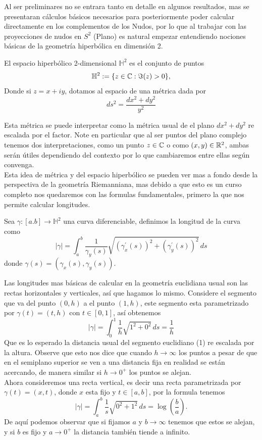 
Al ser preliminares no se entrara tanto en detalle en algunos resultados, mas se presentaran cálculos básicos necesarios para posteriormente poder calcular directamente en los complementos de los Nudos, por lo que al trabajar con las proyecciones de nudos en $S^2$ (Plano) es natural empezar entendiendo nociones básicas de la geometría hiperbólica en dimensión 2.

\begin{definition}
    El espacio hiperbólico 2-dimensional $\mathbb{H}^2$ es el conjunto de puntos
    $$\mathbb{H}^2:=\{z\in\mathbb{C}:\Im(z)>0\},$$
    Donde si $z=x+iy$, dotamos al espacio de una métrica dada por
    $$ds^2=\frac{dx^2+dy^2}{y^2}$$
\end{definition}
Esta métrica se puede interpretar como la métrica usual de el plano $dx^2+dy^2$ re escalada por el factor. Note en particular que al ser puntos del plano complejo tenemos dos interpretaciones, como un punto $z\in\mathbb{C}$ o como $(x,y)\in\mathbb{R}^2$, ambas serán útiles dependiendo del contexto por lo que cambiaremos entre ellas según convenga.\\

Esta idea de métrica y del espacio hiperbólico se pueden ver mas a fondo desde la perspectiva de la geometría Riemanniana, mas debido a que esto es un curso completo nos quedaremos con las formulas fundamentales, primero la que nos permite calcular longitudes.
\begin{definition}
    Sea $\gamma:[a.b]\to \mathbb{H}^2$ una curva diferenciable, definimos la longitud de la curva como 
    $$|\gamma|=\int_a^b\frac{1}{\gamma_y(s)}\sqrt{(\gamma^{\prime}_x(s))^2+(\gamma^{\prime}_y(s))^2}\,ds$$
    donde $\gamma(s)=(\gamma_x(s),\gamma_y(s)).$
\end{definition}


\begin{eg}
    Las longitudes mas básicas de calcular en la geometría euclidiana usual son las rectas horizontales y verticales, así que hagamos lo mismo. Considere el segmento que va del punto $(0,h)$ a el punto $(1,h)$, este segmento esta parametrizado por $\gamma(t)=(t,h)$ con $t\in[0,1]$, así obtenemos
    $$|\gamma|=\int_0^1\frac{1}{h}\sqrt{1^2+0^2}\,ds=\frac{1}{h}$$
    Que es lo esperado la distancia usual del segmento euclidiano (1) re escalada por la altura. Observe que esto nos dice que cuando $h\to\infty$ los puntos a pesar de que en el semiplano superior se ven a una distancia fija en realidad se están acercando, de manera similar si $h\to 0^+$ los puntos se alejan.\\

    Ahora consideremos una recta vertical, es decir una recta parametrizada por $\gamma(t)=(x,t)$, donde $x$ esta fijo y $t\in[a,b]$, por la formula tenemos
    $$|\gamma|=\int_a^b\frac{1}{s}\sqrt{0^2+1^2}\,ds=\log\left(\frac{b}{a}\right).$$
    De aquí podemos observar que si fijamos $a$ y $b\to\infty$ tenemos que estos se alejan, y si $b$ es fijo y $a\to 0^+$ la distancia también tiende a infinito.
    \end{eg}

